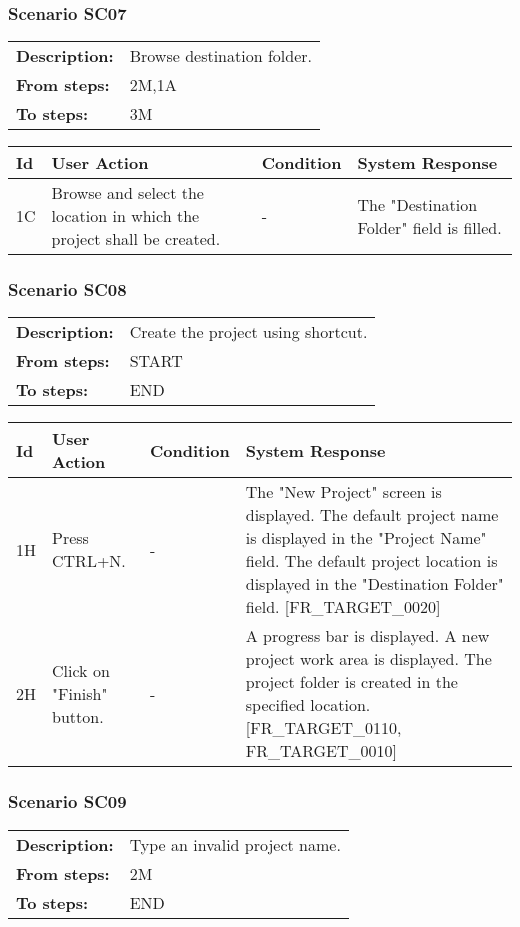 \documentclass[a4paper,11pt]{article}
\newcommand{\bl}{\\ \hline}
\begin{document}
\subsubsection*{Scenario SC07}
\begin{tabular}{p{1in}p{4in}}
{\bf Description:} & Browse destination folder. \\
{\bf From steps:} & 2M,1A \\
{\bf To steps:} & 3M \\
\end{tabular}
 
\begin{tabular}{|p{0.8in}|p{1.6in}|p{1.6in}|p{1.6in}|}
\hline
Id & User Action & Condition & System Response  \bl 
1C & Browse and select the location in which the project shall
						be created. & - & The "Destination Folder" field is filled. \bl 
\end{tabular}
\subsubsection*{Scenario SC08}
\begin{tabular}{p{1in}p{4in}}
{\bf Description:} & Create the project using shortcut. \\
{\bf From steps:} & START \\
{\bf To steps:} & END \\
\end{tabular}
 
\begin{tabular}{|p{0.8in}|p{1.6in}|p{1.6in}|p{1.6in}|}
\hline
Id & User Action & Condition & System Response  \bl 
1H & Press CTRL+N. & - & The "New Project" screen is displayed. The default
						project name is displayed in the "Project Name" field. The default
						project location is displayed in the "Destination Folder" field.
						[FR_TARGET_0020] \bl 
2H & Click on "Finish" button. & - & A progress bar is displayed. A new project work area is
						displayed. The project folder is created in the specified
						location. [FR_TARGET_0110, FR_TARGET_0010] \bl 
\end{tabular}
\subsubsection*{Scenario SC09}
\begin{tabular}{p{1in}p{4in}}
{\bf Description:} & Type an invalid project name. \\
{\bf From steps:} & 2M \\
{\bf To steps:} & END \\
\end{tabular}
 
\end{document}

